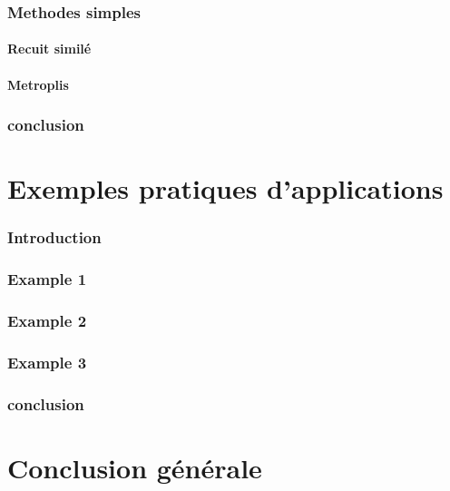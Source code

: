 \documentclass[a4paper,11pt,oneside]{report}
\theoremstyle{plain}
\newcommand{\0}{/ \! \! \! 0}
\theoremstyle{plain}
\begin{document}
\subsection{Methodes simples}

\subsubsection{Recuit simil\'e}

\subsubsection{Metroplis}

\subsection{conclusion}

\chapter{Exemples pratiques d'applications}
\minitoc
\subsection{Introduction}

\subsection{Example 1}

\subsection{Example 2}

\subsection{Example 3}

\subsection{conclusion}

\chapter*{Conclusion g\'en\'erale}
\end{document}
